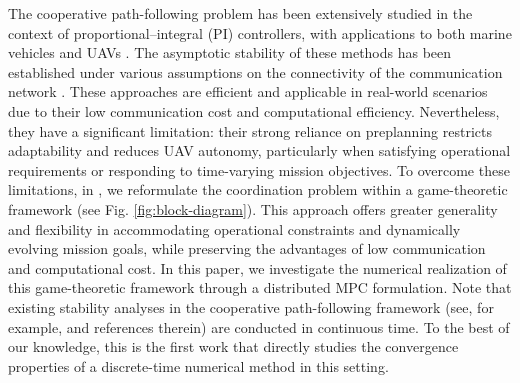 \documentclass[letterpaper,journal]{IEEEtran}
\begin{document}
The cooperative path-following problem has been extensively studied in the context of proportional–integral (PI) controllers, with applications to both marine vehicles \cite{VANNI200775} and UAVs \cite{kaminer2017time}. The asymptotic stability of these methods has been established under various assumptions on the connectivity of the communication network \cite{kaminer2017time, KH-23}. These approaches are efficient and applicable in real-world scenarios due to their low communication cost and computational efficiency. Nevertheless, they have a significant limitation: their strong reliance on preplanning restricts adaptability and reduces UAV autonomy, particularly when satisfying operational requirements or responding to time-varying mission objectives. To overcome these limitations, in \cite{paper}, we reformulate the coordination problem within a game-theoretic framework (see Fig. \ref{fig:block-diagram}). This approach offers greater generality and flexibility in accommodating operational constraints and dynamically evolving mission goals, while preserving the advantages of low communication and computational cost. In this paper, we investigate the numerical realization of this game-theoretic framework through a distributed MPC formulation. Note that existing stability analyses in the cooperative path-following framework (see, for example, \cite{kaminer2017time} and references therein) are conducted in continuous time. To the best of our knowledge, this is the first work that directly studies the convergence properties of a discrete-time numerical method in this setting.
\end{document}
